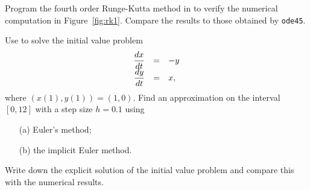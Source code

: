 \documentclass{ximera}
\begin{document}
\begin{exercise} \label{c15.1.8}
Program the fourth order Runge-Kutta method in \Matlab
to verify the numerical computation in Figure~\ref{fig:rk1}.
Compare the results to those obtained by {\tt ode45}.
\end{exercise}

\begin{exercise} \label{c15.1.9}
Use \Matlab to solve the initial value problem
\arraystart
\[
\begin{array}{rcl}
\displaystyle \frac{dx}{dt} & = & -y\\
\displaystyle \frac{dy}{dt} & = & x,
\end{array}
\]
\arrayfinish
where $(x(1),y(1))= (1,0)$.  Find an approximation 
on the interval $[0,12]$ with a step size $h=0.1$ using 
\begin{itemize}
\item[(a)] Euler's method;
\item[(b)] the implicit Euler method.
\end{itemize}
Write down the explicit solution of the initial
value problem and compare this with the numerical
results.  
\end{exercise}
\end{document}
